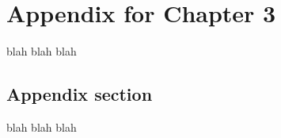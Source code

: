 \chapter{Appendix for Chapter 3}
\label{app:clt_app}

blah blah blah

\section{Appendix section}\label{app:clt_app:sec:appendix}

blah blah blah